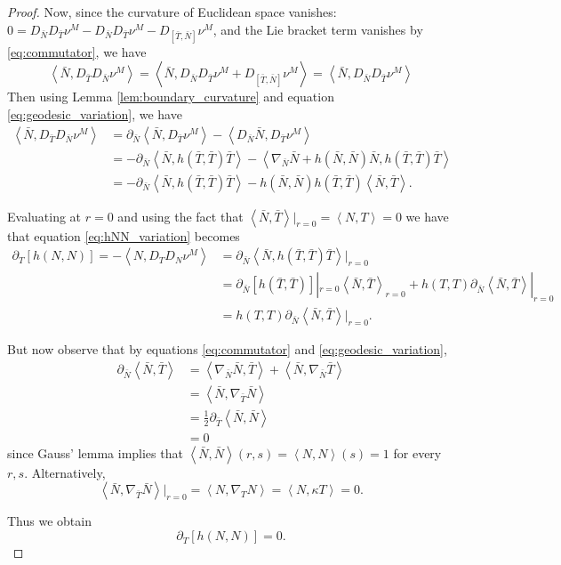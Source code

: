 \documentclass[10pt]{amsart}
\newcommand{\IP}[2]{\left< #1 , #2 \right>}
\theoremstyle{remark}
\begin{document}
\begin{proof}
Now, since the curvature of Euclidean space vanishes: \(0 = D_{\bar{N}} D_{\bar{T}} \nu^M - D_{\bar{N}} D_{\bar{T}} \nu^M - D_{[\bar{T}, \bar{N}]} \nu^M\), and the Lie bracket term vanishes by \eqref{eq:commutator}, we have
\[
\IP{\bar{N}}{D_{\bar{T}} D_{\bar{N}} \nu^M} = \IP{\bar{N}}{D_{\bar{N}} D_{\bar{T}} \nu^M + D_{[\bar{T}, \bar{N}]} \nu^M} = \IP{\bar{N}}{D_{\bar{N}} D_{\bar{T}} \nu^M}
\]
Then using Lemma \ref{lem:boundary_curvature} and equation \eqref{eq:geodesic_variation}, we have
\[
\begin{split}
\IP{\bar{N}}{D_{\bar{T}} D_{\bar{N}} \nu^M} &= \partial_{\bar{N}} \IP{\bar{N}}{D_{\bar{T}} \nu^M} - \IP{D_{\bar{N}} \bar{N}}{D_{\bar{T}} \nu^M} \\
&= -\partial_{\bar{N}} \IP{\bar{N}}{h(\bar{T}, \bar{T}) \bar{T}} - \IP{\nabla_{\bar{N}} \bar{N} + h(\bar{N}, \bar{N}) \bar{N}}{h(\bar{T}, \bar{T}) \bar{T}} \\
&= -\partial_{\bar{N}} \IP{\bar{N}}{h(\bar{T}, \bar{T}) \bar{T}} - h(\bar{N}, \bar{N}) h(\bar{T}, \bar{T}) \IP{\bar{N}}{\bar{T}}.
\end{split}
\]

Evaluating at \(r = 0\) and using the fact that \(\IP{\bar{N}}{\bar{T}}|_{r=0} = \IP{N}{T} = 0\) we have that equation \eqref{eq:hNN_variation} becomes
\[
\begin{split}
\partial_T [h(N, N)] = -\IP{N}{D_T D_N \nu^M} &= \partial_{\bar{N}} \IP{\bar{N}}{h(\bar{T}, \bar{T}) \bar{T}}|_{r=0} \\
&= \partial_{\bar{N}} [h(\bar{T}, \bar{T})]|_{r=0} \IP{\bar{N}}{\bar{T}}_{r=0} + h(T, T) \partial_{\bar{N}} \IP{\bar{N}}{\bar{T}}|_{r=0} \\
&= h(T, T) \partial_{\bar{N}} \IP{\bar{N}}{\bar{T}}|_{r=0}.
\end{split}
\]

But now observe that by equations \eqref{eq:commutator} and \eqref{eq:geodesic_variation},
\[
\begin{split}
\partial_{\bar{N}} \IP{\bar{N}}{\bar{T}} &= \IP{\nabla_{\bar{N}} \bar{N}}{\bar{T}} + \IP{\bar{N}}{\nabla_{\bar{N}} \bar{T}} \\
&= \IP{\bar{N}}{\nabla_{\bar{T}} \bar{N}} \\
&= \frac{1}{2} \partial_{\bar{T}} \IP{\bar{N}}{\bar{N}} \\
&= 0
\end{split}
\]
since Gauss' lemma implies that \(\IP{\bar{N}}{\bar{N}}(r, s) = \IP{N}{N}(s) = 1\) for every \(r, s\). Alternatively,
\[
\IP{\bar{N}}{\nabla_{\bar{T}} \bar{N}}|_{r=0} = \IP{N}{\nabla_T N} = \IP{N}{\kappa T} = 0.
\]

Thus we obtain
\[
\partial_T [h(N, N)] = 0.
\]
\end{proof}
\end{document}
